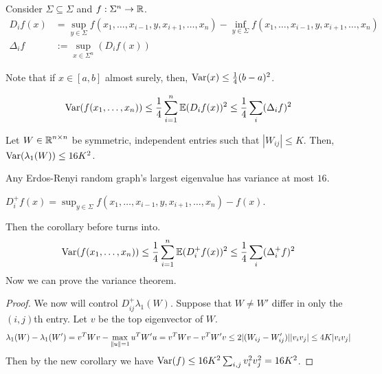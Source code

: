 \begin{definition}
    Consider $\Sigma \subseteq \Sigma$ and $f: \Sigma^n \to \operatorname{\mathbb{R}}$.
    \begin{align*}
        D_i f(x) &= \sup_{y \in \Sigma} f(x_1, \dots, x_{i - 1}, y, x_{i + 1}, \dots, x_n) - \inf_{y \in \Sigma} f(x_1, \dots, x_{i - 1}, y, x_{i + 1}, \dots, x_n)\\
        \Delta_i f &:= \sup_{x \in \Sigma^n} (D_i f(x))
    \end{align*}
\end{definition}
Note that if $x \in [a, b]$ almost surely, then, $\text{Var}(x) \le \frac{1}{4} (b - a)^2$.
\begin{corollary}
    \[ \text{Var}(f(x_1, \dots, x_n)) \le \frac{1}{4} \sum_{i = 1}^n \mathbb{E} (D_i f(x))^2 \le \frac{1}{4} \sum_i (\Delta_i f)^2 \]
\end{corollary}

\begin{theorem}
    Let $W \in \operatorname{\mathbb{R}}^{n \times n}$ be symmetric, independent entries such that $|W_{ij}| \le K$.
    Then, $\text{Var}(\lambda_1(W)) \le 16 K^2$.
\end{theorem}


\begin{corollary}
    Any Erdos-Renyi random graph's largest eigenvalue has variance at most $16$.
\end{corollary}

\begin{definition}
    $D_i^+ f(x) = \sup_{y \in \Sigma} f(x_1, \dots, x_{i - 1}, y, x_{i + 1}, \dots, x_n) - f(x)$.
\end{definition}

Then the corollary before turns into.
\[ \text{Var}(f(x_1, \dots, x_n)) \le \frac{1}{4} \sum_{i = 1}^n \mathbb{E} (D_i^+ f(x))^2 \le \frac{1}{4} \sum_i (\Delta_i^+ f)^2 \]
Now we can prove the variance theorem.
\begin{proof}
    We now will control $D_{ij}^+ \lambda_1(W)$.
    Suppose that $W \neq W'$ differ in only the $(i, j)$th entry. Let $v$
    be the top eigenvector of $W$. 
    \[ \lambda_1(W) - \lambda_1(W') = v^T W v - \max_{\norm{u} = 1} u^T W' u = v^T W v - v^T W' v \le 2 |(W_{ij} - W_{ij}')| |v_i v_j| \le 4K |v_i v_j|\]
    Then by the new corollary we have $\text{Var}(f) \le 16K^2 \sum_{i, j} v_i^2 v_j^2 = 16K^2$.
\end{proof}

